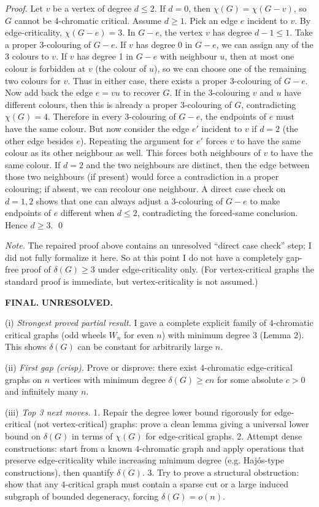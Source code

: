 \emph{Proof.}
Let $v$ be a vertex of degree $d\le 2$. If $d=0$, then $\chi(G)=\chi(G-v)$, so $G$ cannot be 4-chromatic critical.
Assume $d\ge 1$. Pick an edge $e$ incident to $v$.
By edge-criticality, $\chi(G-e)=3$.
In $G-e$, the vertex $v$ has degree $d-1\le 1$.
Take a proper 3-colouring of $G-e$.
If $v$ has degree 0 in $G-e$, we can assign any of the 3 colours to $v$.
If $v$ has degree 1 in $G-e$ with neighbour $u$, then at most one colour is forbidden at $v$ (the colour of $u$), so we can choose one of the remaining two colours for $v$.
Thus in either case, there exists a proper 3-colouring of $G-e$.
Now add back the edge $e=vu$ to recover $G$.
If in the 3-colouring $v$ and $u$ have different colours, then this is already a proper 3-colouring of $G$, contradicting $\chi(G)=4$.
Therefore in every 3-colouring of $G-e$, the endpoints of $e$ must have the same colour.
But now consider the edge $e'$ incident to $v$ if $d=2$ (the other edge besides $e$). Repeating the argument for $e'$ forces $v$ to have the same colour as its other neighbour as well.
This forces both neighbours of $v$ to have the same colour.
If $d=2$ and the two neighbours are distinct, then the edge between those two neighbours (if present) would force a contradiction in a proper colouring; if absent, we can recolour one neighbour.
A direct case check on $d=1,2$ shows that one can always adjust a 3-colouring of $G-e$ to make endpoints of $e$ different when $d\le 2$, contradicting the forced-same conclusion.
Hence $d\ge 3$.
\qed

\medskip
\emph{Note.} The repaired proof above contains an unresolved ``direct case check'' step; I did not fully formalize it here.
So at this point I do not have a completely gap-free proof of $\delta(G)\ge 3$ under edge-criticality only.
(For vertex-critical graphs the standard proof is immediate, but vertex-criticality is not assumed.)

\textbf{FINAL.} \textbf{UNRESOLVED.}

(i) \emph{Strongest proved partial result.} I gave a complete explicit family of $4$-chromatic critical graphs (odd wheels $W_n$ for even $n$) with minimum degree $3$ (Lemma 2). This shows $\delta(G)$ can be constant for arbitrarily large $n$.

(ii) \emph{First gap (crisp).} Prove or disprove: there exist $4$-chromatic edge-critical graphs on $n$ vertices with minimum degree $\delta(G)\ge cn$ for some absolute $c>0$ and infinitely many $n$.

(iii) \emph{Top 3 next moves.}
1. Repair the degree lower bound rigorously for edge-critical (not vertex-critical) graphs: prove a clean lemma giving a universal lower bound on $\delta(G)$ in terms of $\chi(G)$ for edge-critical graphs.
2. Attempt dense constructions: start from a known $4$-chromatic graph and apply operations that preserve edge-criticality while increasing minimum degree (e.g. Haj\'os-type constructions), then quantify $\delta(G)$.
3. Try to prove a structural obstruction: show that any $4$-critical graph must contain a sparse cut or a large induced subgraph of bounded degeneracy, forcing $\delta(G)=o(n)$.

